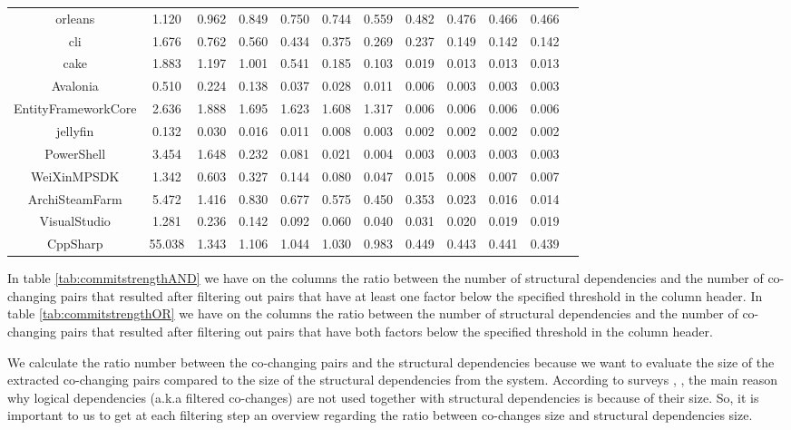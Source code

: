 \documentclass[12pt, a4paper, twoside]{report}
\begin{document}
\begin{table}[!h]
{\begin{tabular}{|c|cccccccccc|c|}
orleans	&	1.120	&	0.962	&	0.849	&	0.750	&	0.744	&	0.559	&	0.482	&	0.476	&	0.466	&	0.466	\\
cli	&	1.676	&	0.762	&	0.560	&	0.434	&	0.375	&	0.269	&	0.237	&	0.149	&	0.142	&	0.142	\\
cake	&	1.883	&	1.197	&	1.001	&	0.541	&	0.185	&	0.103	&	0.019	&	0.013	&	0.013	&	0.013	\\
Avalonia	&	0.510	&	0.224	&	0.138	&	0.037	&	0.028	&	0.011	&	0.006	&	0.003	&	0.003	&	0.003	\\
EntityFrameworkCore	&	2.636	&	1.888	&	1.695	&	1.623	&	1.608	&	1.317	&	0.006	&	0.006	&	0.006	&	0.006	\\
jellyfin	&	0.132	&	0.030	&	0.016	&	0.011	&	0.008	&	0.003	&	0.002	&	0.002	&	0.002	&	0.002	\\
PowerShell	&	3.454	&	1.648	&	0.232	&	0.081	&	0.021	&	0.004	&	0.003	&	0.003	&	0.003	&	0.003	\\
WeiXinMPSDK	&	1.342	&	0.603	&	0.327	&	0.144	&	0.080	&	0.047	&	0.015	&	0.008	&	0.007	&	0.007	\\
ArchiSteamFarm	&	5.472	&	1.416	&	0.830	&	0.677	&	0.575	&	0.450	&	0.353	&	0.023	&	0.016	&	0.014	\\
VisualStudio	&	1.281	&	0.236	&	0.142	&	0.092	&	0.060	&	0.040	&	0.031	&	0.020	&	0.019	&	0.019	\\
CppSharp	&	55.038	&	1.343	&	1.106	&	1.044	&	1.030	&	0.983	&	0.449	&	0.443	&	0.441	&	0.439	\\


\hline
\end{tabular}
}
\end{table}


In table \ref{tab:commitstrengthAND} we have on the columns the ratio between the number of structural dependencies and the number of co-changing pairs that resulted after filtering out pairs that have at least one factor below the specified threshold in the column header.
In table \ref{tab:commitstrengthOR} we have on the columns the ratio between the number of structural dependencies and the number of co-changing pairs that resulted after filtering out pairs that have both factors below the specified threshold in the column header.

We calculate the ratio number between the co-changing pairs and the structural dependencies because we want to evaluate the size of the extracted co-changing pairs compared to the size of the structural dependencies from the system. 
According to surveys \cite{Shtern:2012:CMS:2332427.2332428}, \cite{sar}, the main reason why logical dependencies (a.k.a filtered co-changes) are not used together with structural dependencies is because of their size. So, it is important to us to get at each filtering step an overview regarding the ratio between co-changes size and structural dependencies size.
\end{document}
